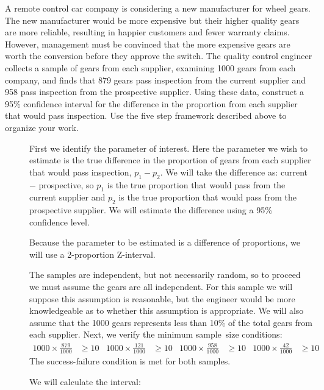 \begin{examplewrap}
\begin{nexample}{A remote control car company is considering a new manufacturer for wheel gears. The new manufacturer would be more expensive but their higher quality gears are more reliable, resulting in happier customers and fewer warranty claims. However, management must be convinced that the more expensive gears are worth the conversion before they approve the switch. The quality control engineer collects a sample of gears from each supplier, examining 1000 gears from each company, and finds that 879 gears pass inspection from the current supplier and 958 pass inspection from the prospective supplier. Using these data, construct a 95\% confidence interval for the difference in the proportion from each supplier that would pass inspection.  Use the five step framework described above to organize your work.}
\label{RemoteControl}
\begin{description}
\item[] First we identify the parameter of interest.  Here the parameter we wish to estimate is the true difference in the proportion of gears from each supplier that would pass inspection, $p_1-p_2$.  We will take the difference as:  current $-$ prospective, so $p_1$ is the true proportion that would pass from the current supplier and $p_2$ is the true proportion that would pass from the prospective supplier.  We will estimate the difference using a 95\% confidence level.  
\item[] Because the parameter to be estimated is a difference of proportions, we will use a 2-proportion Z-interval.
\item[] The samples are independent, but not necessarily random, so to proceed we must assume the gears are all independent. For this sample we will suppose this assumption is reasonable, but the engineer would be more knowledgeable as to whether this assumption is appropriate. We will also assume that the 1000 gears represents less than 10\% of the total gears from each supplier. Next, we verify the minimum sample~size conditions:
\begin{align*}
1000 \times \frac{879}{1000} &\ge 10
	&1000 \times \frac{121}{1000} &\ge 10
	&1000 \times \frac{958}{1000} &\ge 10
	&1000 \times \frac{42}{1000} &\ge 10
\end{align*}
The success-failure condition is met for both samples.
\item[]  We will calculate the interval: 

\end{description}
\end{nexample}
\end{examplewrap}
